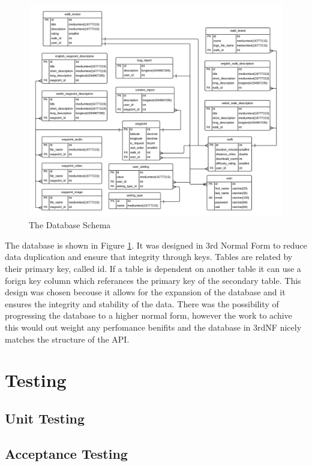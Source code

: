 \documentclass[11pt,a4paper]{report}
\begin{document}
\begin{figure}[H]
    \centering
    \includegraphics[width=\textwidth]{DatabaseSchema}
    \caption{The Database Schema}
    \label{fig:databaseschema}
\end{figure}

The database is shown in Figure \ref{fig:databaseschema}. It was designed in 3rd Normal Form to reduce data duplication and ensure that integrity through keys. Tables are related by their primary key, called id. If a table is dependent on another table it can use a forign key column which referances the primary key of the secondary table. This design was chosen becouse it allows for the expansion of the database and it ensures the integrity and stability of the data. There was the possibility of progressing the database to a higher normal form, however the work to achive this would out weight any perfomance benifits and the database in 3rdNF nicely matches the structure of the API. 

\chapter{Testing}
\label{sec:testing}
\section{Unit Testing}
\label{sec:unit-testint}
\section{Acceptance Testing}
\label{sec:acceptance-testint}
\end{document}
